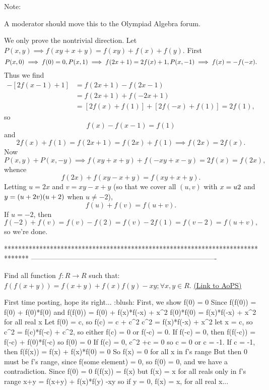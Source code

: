 \begin{solution}
	\begin{bolded}Note:\end{bolded} A moderator should move this to the Olympiad Algebra forum.

We only prove the nontrivial direction. Let $P(x,y)\implies f(xy+x+y)=f(xy)+f(x)+f(y)$. First
\[P(x,0)\implies f(0)=0,\\
P(x,1)\implies f(2x+1)=2f(x)+1,\\
P(x,-1)\implies f(x)=-f(-x).\]Thus we find
\begin{align*}
[2f(x)+1]-[2f(x-1)+1]
&= f(2x+1)-f(2x-1)\\
&=f(2x+1)+f(-2x+1)\\
&=[2f(x)+f(1)]+[2f(-x)+f(1)]=2f(1),
\end{align*}so
\[f(x)-f(x-1)=f(1)\]and
\[2f(x)+f(1)=f(2x+1)=f(2x)+f(1)\implies f(2x)=2f(x).\]Now
\[P(x,y)+P(x,-y)\implies f(xy+x+y)+f(-xy+x-y)=2f(x)=f(2x),\]whence
\[f(2x)+f(xy-x+y)=f(xy+x+y).\]Letting $u=2x$ and $v=xy-x+y$ (so that we cover all $(u,v)$ with $x=u\/2$ and $y=(u+2v)\/(u+2)$ when $u\ne-2$),
\[f(u)+f(v)=f(u+v).\]If $u=-2$, then
\[f(-2)+f(v)=f(v)-f(2)=f(v)-2f(1)=f(v-2)=f(u+v),\]so we're done.
\end{solution}
*******************************************************************************
-------------------------------------------------------------------------------

\begin{problem}
	Find all function $f:R \rightarrow R$ such that:
$f(f(x+y))=f(x+y)+f(x)f(y)-xy;\forall x,y \in R$.
	\flushright \href{https://artofproblemsolving.com/community/c6h6409}{(Link to AoPS)}
\end{problem}



\begin{solution}
	First time posting, hope its right...  :blush: 
First, we show f(0) = 0
Since f(f(0)) = f(0) + f(0)*f(0) and f(f(0)) = f(0) + f(x)*f(-x) + x^2 
f(0)*f(0) = f(x)*f(-x) + x^2 for all real x   Let f(0) = c, so f(c) = c + c^2
c^2 = f(x)*f(-x) + x^2   let x = c, so c^2 = f(c)*f(-c) + c^2, so either f(c) = 0 or f(-c) = 0.
If f(-c) = 0, then f(f(-c)) = f(-c) + f(0)*f(-c)   so f(0) = 0
If f(c) = 0, c^2 +c = 0 so c = 0 or c = -1.
If c = -1, then f(f(x)) = f(x) + f(x)*f(0) = 0  So f(x) = 0 for all x in f's range
But then 0 must be f's range, since f(some element) = 0, so f(0) = 0, and we have a contradiction.
Since f(0) = 0
f(f(x)) = f(x)  but f(x) = x for all reals only in f's range 
x+y = f(x+y) + f(x)*f(y) -xy  so if y = 0, f(x) = x, for all real x...
\end{solution}



